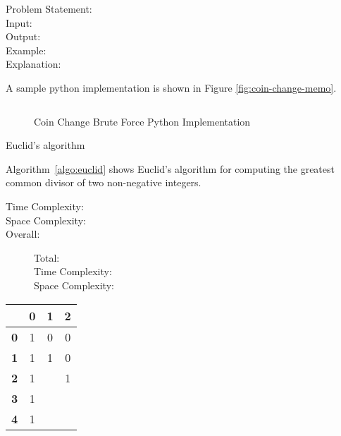 \begin{description}
    \item[Problem Statement:]
        
    \item[Input:] 
        
    \item[Output:] 
        
    \item[Example:]
        

    \item[Explanation:]
        
\end{description}

A sample python implementation is shown in Figure \ref{fig:coin-change-memo}.

\begin{figure}[H]
    \centering
    \begin{lstlisting}

    \end{lstlisting}
    \caption{Coin Change Brute Force Python Implementation}
    \label{fig:coin-change-bf}
\end{figure}


\begin{algorithm}
    \caption{Euclid's algorithm}
    \label{algo:euclid}
\end{algorithm}

Algorithm~\ref{algo:euclid} shows Euclid's algorithm for computing the greatest common divisor of two non-negative integers.


\begin{description}
    \item[Time Complexity:]
        
        
    \item[Space Complexity:] 
        
        
    \item[Overall:] Total:\\
        Time Complexity:\\
        Space Complexity:
    
\end{description}

\begin{table}[htbp]
    \centering
    \begin{tabular}{|c|c|c|c|}
        \hline
          & \textbf{0} & \textbf{1} & \textbf{2} \\
        \hline
        \textbf{0} & 1 & 0 & 0 \\
        \hline
        \textbf{1} & 1 & 1 & 0 \\
        \hline
        \textbf{2} & 1 &   & 1 \\
        \hline
        \textbf{3} & 1 &   &  \\
        \hline
        \textbf{4} & 1 &   &   \\
        \hline
    \end{tabular}
    \label{tab:grid}
\end{table}